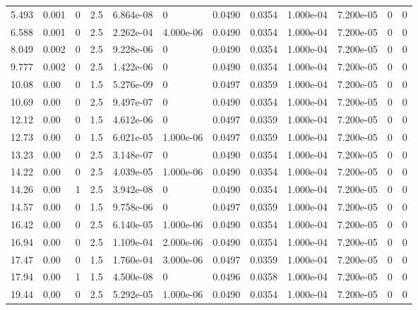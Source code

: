 \documentclass[preview]{standalone}
\begin{document}
{{\begin{tabular}{L{1.2cm}C{1.2cm} C{0.3cm}C{0.5cm} C{1.4cm}C{1.4cm} C{1.4cm}C{1.4cm} C{1.6cm}C{1.6cm} C{1.6cm}C{1.6cm}}
  5.493  &  0.001  & 0     & 2.5 &  6.864e-08  & 0  &  0.0490&   0.0354& 1.000e-04 & 7.200e-05   &  0 & 0  \\ 
  6.588  &  0.001  & 0     & 2.5 &  2.262e-04  & 4.000e-06  &  0.0490&   0.0354& 1.000e-04 & 7.200e-05   &  0 & 0  \\ 
  8.049  &  0.002  & 0     & 2.5 &  9.228e-06  & 0  &  0.0490&   0.0354& 1.000e-04 & 7.200e-05   &  0 & 0  \\ 
  9.777  &  0.002  & 0     & 2.5 &  1.422e-06  & 0  &  0.0490&   0.0354& 1.000e-04 & 7.200e-05   &  0 & 0  \\ 
  10.08  &  0.00  & 0     & 1.5 &  5.276e-09  & 0  &  0.0497&   0.0359& 1.000e-04 & 7.200e-05   &  0 & 0  \\ 
  10.69  &  0.00  & 0     & 2.5 &  9.497e-07  & 0  &  0.0490&   0.0354& 1.000e-04 & 7.200e-05   &  0 & 0  \\ 
  12.12  &  0.00  & 0     & 1.5 &  4.612e-06  & 0  &  0.0497&   0.0359& 1.000e-04 & 7.200e-05   &  0 & 0  \\ 
  12.73  &  0.00  & 0     & 1.5 &  6.021e-05  & 1.000e-06  &  0.0497&   0.0359& 1.000e-04 & 7.200e-05   &  0 & 0  \\ 
  13.23  &  0.00  & 0     & 2.5 &  3.148e-07  & 0  &  0.0490&   0.0354& 1.000e-04 & 7.200e-05   &  0 & 0  \\ 
  14.22  &  0.00  & 0     & 2.5 &  4.039e-05  & 1.000e-06  &  0.0490&   0.0354& 1.000e-04 & 7.200e-05   &  0 & 0  \\ 
  14.26  &  0.00  & 1     & 2.5 &  3.942e-08  & 0  &  0.0490&   0.0354& 1.000e-04 & 7.200e-05   &  0 & 0  \\ 
  14.57  &  0.00  & 0     & 1.5 &  9.758e-06  & 0  &  0.0497&   0.0359& 1.000e-04 & 7.200e-05   &  0 & 0  \\ 
  16.42  &  0.00  & 0     & 2.5 &  6.140e-05  & 1.000e-06  &  0.0490&   0.0354& 1.000e-04 & 7.200e-05   &  0 & 0  \\ 
  16.94  &  0.00  & 0     & 2.5 &  1.109e-04  & 2.000e-06  &  0.0490&   0.0354& 1.000e-04 & 7.200e-05   &  0 & 0  \\ 
  17.47  &  0.00  & 0     & 1.5 &  1.760e-04  & 3.000e-06  &  0.0497&   0.0359& 1.000e-04 & 7.200e-05   &  0 & 0  \\ 
  17.94  &  0.00  & 1     & 1.5 &  4.500e-08  & 0  &  0.0496&   0.0358& 1.000e-04 & 7.200e-05   &  0 & 0  \\ 
  19.44  &  0.00  & 0     & 2.5 &  5.292e-05  & 1.000e-06  &  0.0490&   0.0354& 1.000e-04 & 7.200e-05   &  0 & 0  \\ 

\end{tabular}}}
\end{document}
